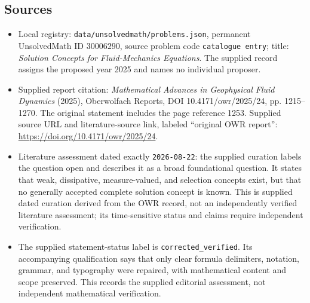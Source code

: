 \documentclass[11pt]{article}
\begin{document}
\subsection{Sources}
\begin{itemize}
\item Local registry: \texttt{data/unsolvedmath/problems.json}, permanent UnsolvedMath ID \(30006290\), source problem code \texttt{catalogue entry}; title: \emph{Solution Concepts for Fluid-Mechanics Equations}. The supplied record assigns the proposed year 2025 and names no individual proposer.
\item Supplied report citation: \emph{Mathematical Advances in Geophysical Fluid Dynamics} (2025), Oberwolfach Reports, DOI 10.4171/owr/2025/24, pp. 1215--1270. The original statement includes the page reference 1253. Supplied source URL and literature-source link, labeled ``original OWR report'': \url{https://doi.org/10.4171/owr/2025/24}.
\item Literature assessment dated exactly \texttt{2026-08-22}: the supplied curation labels the question open and describes it as a broad foundational question. It states that weak, dissipative, measure-valued, and selection concepts exist, but that no generally accepted complete solution concept is known. This is supplied dated curation derived from the OWR record, not an independently verified literature assessment; its time-sensitive status and claims require independent verification.
\item The supplied statement-status label is \texttt{corrected\_verified}. Its accompanying qualification says that only clear formula delimiters, notation, grammar, and typography were repaired, with mathematical content and scope preserved. This records the supplied editorial assessment, not independent mathematical verification.
\end{itemize}
\end{document}
